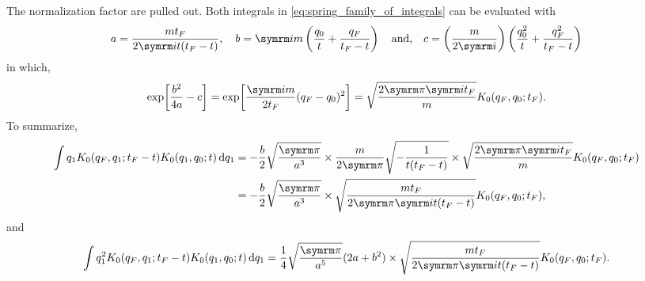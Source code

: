 The normalization factor are pulled out. Both integrals in \cref{eq:spring_family_of_integrals} can be evaluated with
\begin{equation}
    a = \frac{m t_F}{2\im t(t_F - t)}, \quad b = \im m\left(\frac{q_0}{t} + \frac{q_F}{t_F - t}\right) \mathand c = \left(\frac{m}{2\im}\right)\left(\frac{q_0^2}{t} + \frac{q_F^2}{t_F - t}\right)
\end{equation}
in which,
\begin{equation}
    \exp[\frac{b^2}{4a} - c] = \exp[\frac{\im m}{2t_F}(q_F - q_0)^2] = \sqrt{\frac{2\cpi\im t_F}{m}}K_0(q_F, q_0; t_F).
\end{equation}
To summarize,
\begin{align}
    \int q_1K_0(q_F, q_1; t_F - t)K_0(q_1, q_0; t)\dd{q_1} &= -\frac{b}{2}\sqrt{\frac{\cpi}{a^3}}\times\frac{m}{2\cpi}\sqrt{-\frac{1}{t(t_F - t)}}\times\sqrt{\frac{2\cpi\im t_F}{m}}K_0(q_F, q_0; t_F) \nonumber\\
    &= -\frac{b}{2}\sqrt{\frac{\cpi}{a^3}} \times \sqrt{\frac{mt_F}{2\cpi\im t(t_F - t)}}K_0(q_F, q_0; t_F), \label{eq:spring_deg1gaussian_form}
\end{align}
and
\begin{equation}
    \int q_1^2K_0(q_F, q_1; t_F - t)K_0(q_1, q_0; t)\dd{q_1} = \frac{1}{4}\sqrt{\frac{\cpi}{a^5}}(2a + b^2) \times \sqrt{\frac{mt_F}{2\cpi\im t(t_F - t)}}K_0(q_F, q_0; t_F). \label{eq:spring_deg2gaussian_form}
\end{equation}


